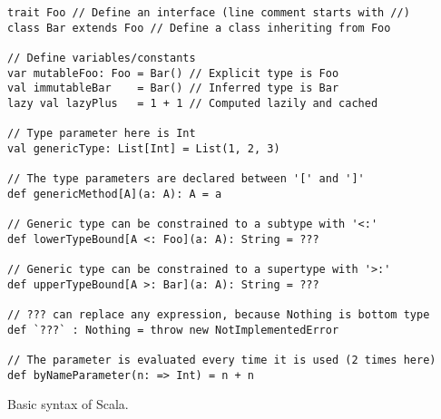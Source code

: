 \begin{algorithm}

\begin{verbatim}
trait Foo // Define an interface (line comment starts with //)
class Bar extends Foo // Define a class inheriting from Foo

// Define variables/constants
var mutableFoo: Foo = Bar() // Explicit type is Foo
val immutableBar    = Bar() // Inferred type is Bar
lazy val lazyPlus   = 1 + 1 // Computed lazily and cached

// Type parameter here is Int
val genericType: List[Int] = List(1, 2, 3)

// The type parameters are declared between '[' and ']'
def genericMethod[A](a: A): A = a

// Generic type can be constrained to a subtype with '<:'
def lowerTypeBound[A <: Foo](a: A): String = ???

// Generic type can be constrained to a supertype with '>:'
def upperTypeBound[A >: Bar](a: A): String = ???

// ??? can replace any expression, because Nothing is bottom type
def `???` : Nothing = throw new NotImplementedError

// The parameter is evaluated every time it is used (2 times here)
def byNameParameter(n: => Int) = n + n
\end{verbatim}

\caption{Basic syntax of Scala. \label{scala:basics}}
\end{algorithm}